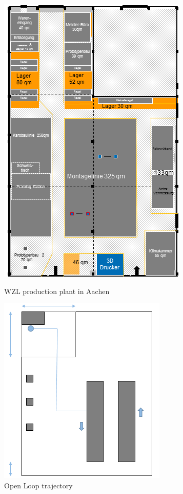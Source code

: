 \documentclass[11pt,a4paper]{article}
\begin{document}
\begin{figure}[!htb]
    \centering
    \begin{minipage}{.5\textwidth}
        \centering
        \includegraphics[width=0.7\linewidth, height=0.4\textheight]{figures/Layout_WZL}
        \caption{WZL production plant in Aachen}
        \label{fig:WZL_Layout}
    \end{minipage}%
    \begin{minipage}{0.5\textwidth}
        \centering
        \includegraphics[width=0.6\linewidth, height=0.2\textheight]{figures/close_loop}
        \caption{Open Loop trajectory}
        \label{fig:traj}
    \end{minipage}
 \end{figure}
\end{document}

